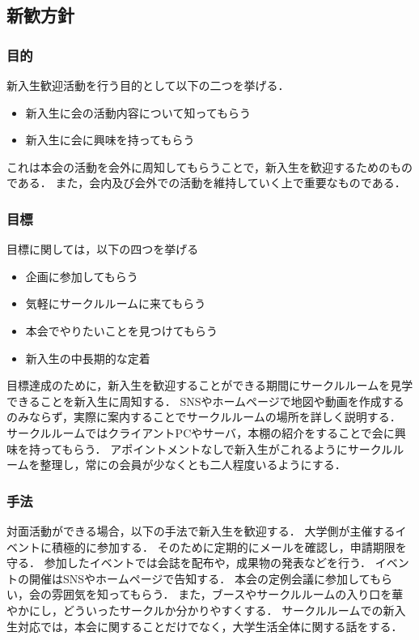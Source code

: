 \subsection*{新歓方針}


\subsubsection*{目的}
新入生歓迎活動を行う目的として以下の二つを挙げる．
\begin{itemize}
\item 新入生に会の活動内容について知ってもらう
\item 新入生に会に興味を持ってもらう
\end{itemize}
これは本会の活動を会外に周知してもらうことで，新入生を歓迎するためのものである．
また，会内及び会外での活動を維持していく上で重要なものである．

\subsubsection*{目標}
目標に関しては，以下の四つを挙げる
\begin{itemize}
\item 企画に参加してもらう
\item 気軽にサークルルームに来てもらう
\item 本会でやりたいことを見つけてもらう
\item 新入生の中長期的な定着
\end{itemize}
目標達成のために，新入生を歓迎することができる期間にサークルルームを見学できることを新入生に周知する．
SNSやホームページで地図や動画を作成するのみならず，実際に案内することでサークルルームの場所を詳しく説明する．
サークルルームではクライアントPCやサーバ，本棚の紹介をすることで会に興味を持ってもらう．
アポイントメントなしで新入生がこれるようにサークルルームを整理し，常に\secondGrade{}の会員が少なくとも二人程度いるようにする．

\subsubsection*{手法}
対面活動ができる場合，以下の手法で新入生を歓迎する．
大学側が主催するイベントに積極的に参加する．
そのために定期的にメールを確認し，申請期限を守る．
参加したイベントでは会誌を配布や，成果物の発表などを行う．
イベントの開催はSNSやホームページで告知する．
本会の定例会議に参加してもらい，会の雰囲気を知ってもらう．
また，ブースやサークルルームの入り口を華やかにし，どういったサークルか分かりやすくする．
サークルルームでの新入生対応では，本会に関することだけでなく，大学生活全体に関する話をする．
